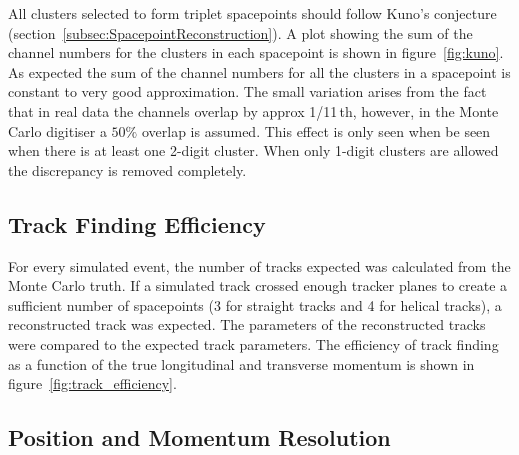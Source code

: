   All clusters selected to form triplet spacepoints should follow Kuno's conjecture (section~\ref{subsec:SpacepointReconstruction}). A plot showing the sum of the channel numbers for the clusters in each spacepoint is shown in figure~\ref{fig:kuno}. As expected the sum of the channel numbers for all the clusters in a spacepoint is constant to very good approximation.  The small variation arises from the fact that in real data the channels overlap by approx 1/11\,th, however, in the Monte Carlo digitiser a $50\%$ overlap is assumed. This effect is only seen when be seen when there is at least one 2-digit cluster. When only 1-digit clusters are allowed the discrepancy is removed completely.

  \subsection{Track Finding Efficiency}
  \label{sec:performance:track_finding}

  For every simulated event, the number of tracks expected was calculated from the Monte Carlo truth. If a simulated track crossed enough tracker planes to create a sufficient number of spacepoints (3 for straight tracks and 4 for helical tracks), a reconstructed track was expected. The parameters of the reconstructed tracks were compared to the expected track parameters. The efficiency of track finding as a function of the true longitudinal and transverse momentum is shown in figure~\ref{fig:track_efficiency}.



  \subsection{Position and Momentum Resolution}
  \label{sec:performance:resolutions}
  

